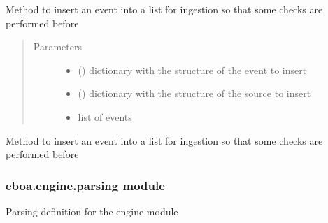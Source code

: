 \begin{fulllineitems}
\label{\detokenize{eboa.engine:eboa.engine.ingestion.insert_event_for_ingestion}}
Method to insert an event into a list for ingestion so that some checks are performed before
\begin{quote}\begin{description}
\item[{Parameters}] \leavevmode\begin{itemize}
\item {} 
 () \textendash{} dictionary with the structure of the event to insert

\item {} 
 () \textendash{} dictionary with the structure of the source to insert

\item {} 
 \textendash{} list of events

\end{itemize}

\end{description}\end{quote}

\end{fulllineitems}


\begin{fulllineitems}
\label{\detokenize{eboa.engine:eboa.engine.ingestion.remove_namespaces}}
Method to insert an event into a list for ingestion so that some checks are performed before

\end{fulllineitems}



\subsubsection{eboa.engine.parsing module}
\label{\detokenize{eboa.engine:module-eboa.engine.parsing}}\label{\detokenize{eboa.engine:eboa-engine-parsing-module}}
Parsing definition for the engine module

